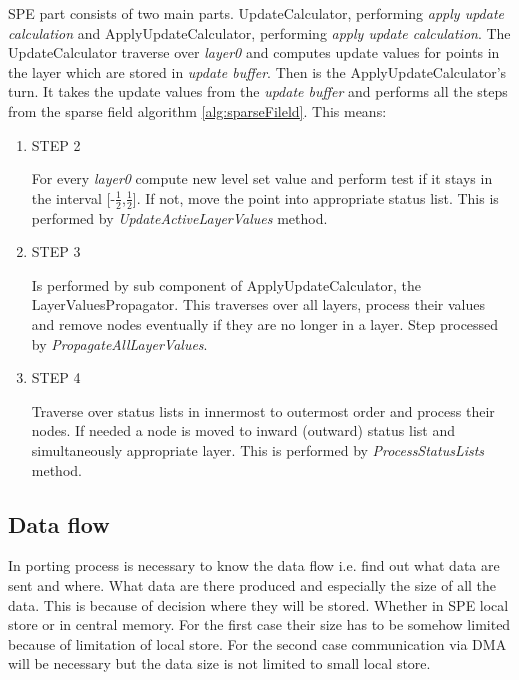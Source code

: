 SPE part consists of two main parts.
UpdateCalculator, performing \emph{apply update calculation} and ApplyUpdateCalculator, performing \emph{apply update calculation}.
The UpdateCalculator traverse over \emph{layer0} and computes update values for points in the layer which are stored in \emph{update buffer}.
Then is the ApplyUpdateCalculator's turn.
It takes the update values from the \emph{update buffer} and performs all the steps from the sparse field algorithm \ref{alg:sparseFileld}.
This means:
\begin{enumerate}
\item STEP 2
\par
For every \emph{layer0} compute new level set value and perform test if it stays in the interval [-$\frac{1}{2}$,$\frac{1}{2}$].
If not, move the point into appropriate status list.
This is performed by \emph{UpdateActiveLayerValues} method.

\item STEP 3
\par
Is performed by sub component of ApplyUpdateCalculator, the LayerValuesPropagator.
This traverses over all layers, process their values and remove nodes eventually if they are no longer in a layer.
Step processed by \emph{PropagateAllLayerValues}.

\item STEP 4
\par
Traverse over status lists in innermost to outermost order and process their
nodes. If needed a node is moved to inward (outward) status list and
simultaneously appropriate layer. This is performed by \emph{ProcessStatusLists}
method.
\end{enumerate}

\subsection{Data flow}

\par
In porting process is necessary to know the data flow i.e. find out what data are sent and where.
What data are there produced and especially the size of all the data.
This is because of decision where they will be stored.
Whether in SPE local store or in central memory.
For the first case their size has to be somehow limited because of limitation of local store.
For the second case communication via DMA will be necessary but the data size is not limited to small local store.

